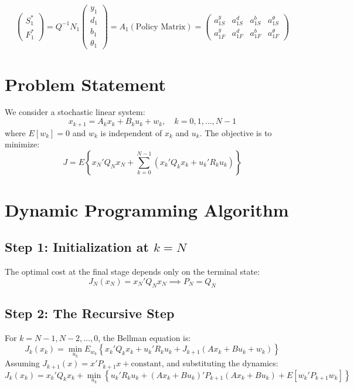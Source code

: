 \begin{equation}
    \begin{pmatrix} 
    S_1^* \\ 
    F_1^* \end{pmatrix} 
    = Q^{-1} N_1 
    \begin{pmatrix} 
    y_1 \\ 
    d_1 \\ 
    b_1 \\ 
    \theta_1 
    \end{pmatrix} 
    = A_1 (\text{Policy Matrix}) 
    = 
    \begin{pmatrix} 
    a_{1S}^y & a_{1S}^d & a_{1S}^b & a_{1S}^\theta \\ 
    a_{1F}^y & a_{1F}^d & a_{1F}^b & a_{1F}^\theta 
    \end{pmatrix}
    \label{eq:matrix}
\end{equation}



\section{Problem Statement}
We consider a stochastic linear system:
\begin{equation}
x_{k+1} = A_k x_k + B_k u_k + w_k, \quad k=0, 1, \dots, N-1
\end{equation}
where $E[w_k] = 0$ and $w_k$ is independent of $x_k$ and $u_k$. The objective is to minimize:
\begin{equation}
J = E \left\{ x_N' Q_N x_N + \sum_{k=0}^{N-1} (x_k' Q_k x_k + u_k' R_k u_k) \right\}
\end{equation}

\section{Dynamic Programming Algorithm}

\subsection{Step 1: Initialization at $k=N$}
The optimal cost at the final stage depends only on the terminal state:
\begin{equation}
J_N(x_N) = x_N' Q_N x_N \implies P_N = Q_N
\end{equation}

\subsection{Step 2: The Recursive Step}
For $k = N-1, N-2, \dots, 0$, the Bellman equation is:
\begin{equation}
J_k(x_k) = \min_{u_k} E_{w_k} \left\{ x_k' Q_k x_k + u_k' R_k u_k + J_{k+1}(Ax_k + Bu_k + w_k) \right\}
\end{equation}
Assuming $J_{k+1}(x) = x' P_{k+1} x + \text{constant}$, and substituting the dynamics:
\begin{equation}
J_k(x_k) = x_k' Q_k x_k + \min_{u_k} \left\{ u_k' R_k u_k + (Ax_k + Bu_k)' P_{k+1} (Ax_k + Bu_k) + E[w_k' P_{k+1} w_k] \right\}
\end{equation}


